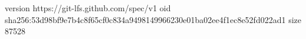 version https://git-lfs.github.com/spec/v1
oid sha256:53d98bf9e7b4c8f65cf0c834a9498149966230e01ba02ee4f1ec8e52fd022ad1
size 87528
